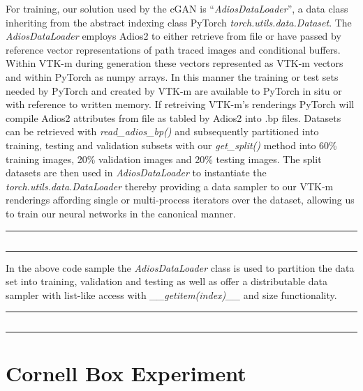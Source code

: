 \documentclass[sigconf]{acmart}%
\begin{document}
For training, our solution used by the cGAN is ``{\it AdiosDataLoader}'', a data class inheriting from the abstract indexing class PyTorch {\it torch.utils.data.Dataset}. The {\it AdiosDataLoader} employs Adios2 to either retrieve from file or have passed by reference vector representations of path traced images and conditional buffers. Within VTK-m during generation these vectors represented as VTK-m vectors and within PyTorch as numpy arrays. In this manner the training or test sets needed by PyTorch and created by VTK-m are available to PyTorch in situ or with reference to written memory. If retreiving VTK-m's renderings PyTorch will compile Adios2 attributes from file as tabled by Adios2 into .bp files. Datasets can be retrieved with {\it read\_adios\_bp()} and subsequently partitioned into training, testing and validation subsets with our {\it get\_split()} method into 60\% training images, 20\% validation images and 20\% testing images. The split datasets are then used in {\it AdiosDataLoader} to instantiate the {\it torch.utils.data.DataLoader} thereby providing a data sampler to our VTK-m renderings affording single or multi-process iterators over the dataset, allowing us to train our neural networks in the canonical manner.

\noindent\rule{0.5\textwidth}{1pt}
\inputminted{python}{pytorchDataLoader.py}
\noindent\rule{0.5\textwidth}{1pt}

In the above code sample the {\it AdiosDataLoader} class is used to partition the data set into training, validation and testing as well as offer a distributable data sampler with list-like access with {\it \_\_getitem(index)\_\_} and size functionality.

\noindent\rule{0.5\textwidth}{1pt}
\inputminted{python}{adiosdataloader.py}
\noindent\rule{0.5\textwidth}{1pt}

\section{Cornell Box Experiment}
\end{document}
